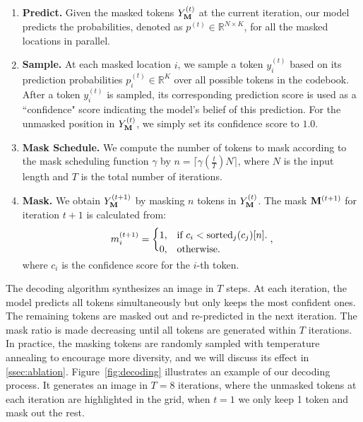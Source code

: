 \vspace{-2mm}
 \begin{enumerate}
     \item \textbf{Predict.}  Given the masked tokens $Y_{\mathbf{M}}^{(t)}$ at the current iteration, our model predicts the probabilities, denoted as $p^{(t)} \in \mathbb{R}^{N \times K}$, for all the masked locations in parallel.  \\ \vspace{-5mm}
     \item \textbf{Sample.} At each masked location $i$, we sample a token $y_i^{(t)}$ based on its prediction probabilities $p_i^{(t)} \in \mathbb{R}^K$ over all possible tokens in the codebook. After a token $y_i^{(t)}$ is sampled, its corresponding prediction score is used as a ``confidence" score indicating the model's belief of this prediction. 
     For the unmasked position in $Y_{\mathbf{M}}^{(t)}$, we simply set its confidence score to $1.0$. \\ \vspace{-5mm}
    \item \textbf{Mask Schedule.} We compute the number of tokens to mask according to the mask scheduling function $\gamma$ by $n = \lceil \gamma(\frac{t}{T}) N \rceil$, where $N$ is the input length and $T$ is the total number of iterations.
    \item \textbf{Mask.} We obtain $Y_{\mathbf{M}}^{(t+1)}$ by masking $n$ tokens in $Y_{\mathbf{M}}^{(t)}$. The mask ${\mathbf{M}}^{(t+1)}$ for iteration $t+1$ is calculated from:\vspace{-2mm}
        \begin{equation*}
         m_{i}^{(t+1)} = 
        \begin{cases}
            1,  & \text{if $c_i < {\text{sorted}}_j(c_j)[n]$.}\\
            0,  & \text{otherwise.}\vspace{-2mm}
        \end{cases},
        \end{equation*}
    where $c_i$ is the confidence score for the $i$-th token.

 \end{enumerate}


The decoding algorithm synthesizes an image in $T$ steps. At each iteration, the model predicts all tokens simultaneously but only keeps the most confident ones. The remaining tokens are masked out and re-predicted in the next iteration. The mask ratio is made decreasing until all tokens are generated within $T$ iterations. In practice, the masking tokens are randomly sampled with temperature annealing to encourage more diversity, and we will discuss its effect in \ref{ssec:ablation}. Figure~\ref{fig:decoding} illustrates an example of our decoding process. It generates an image in $T=8$ iterations, where the unmasked tokens at each iteration are highlighted in the grid, \eg when $t=1$ we only keep 1 token and mask out the rest.

